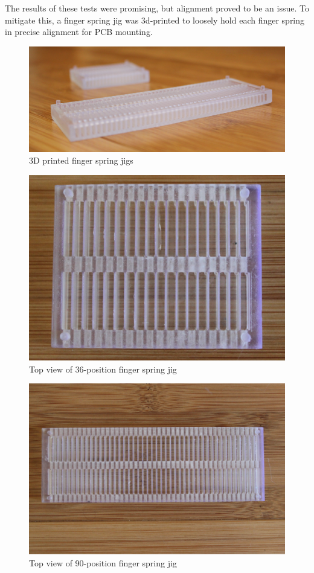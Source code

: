 \documentclass[11pt,twoside]{mitthesis}
\begin{document}
The results of these tests were promising, but alignment proved to be an issue.
To mitigate this, a finger spring jig was 3d-printed to loosely hold each finger spring in precise alignment for PCB mounting.
\begin{figure}[h]
  \begin{center}
      \includegraphics[width=.8\textwidth]{../bb-18-45.png}
      \caption{3D printed finger spring jigs}
  \end{center}
\end{figure}

\begin{figure}[h]
  \begin{center}
      \includegraphics[width=.55\textwidth]{../bb-18.png}
      \caption{Top view of 36-position finger spring jig}
  \end{center}
\end{figure}

\begin{figure}[h]
  \begin{center}
      \includegraphics[width=.6\textwidth]{../bb-45.png}
      \caption{Top view of 90-position finger spring jig}
  \end{center}
\end{figure}
\end{document}
